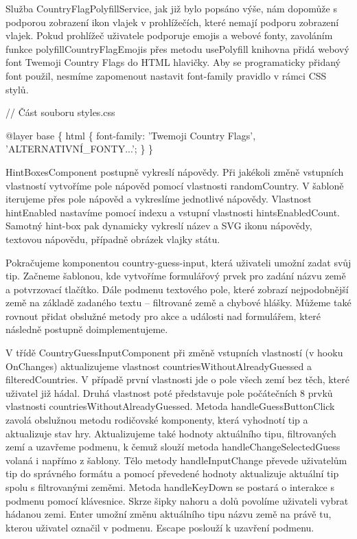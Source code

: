 Služba CountryFlagPolyfillService, jak již bylo popsáno výše, nám dopomůže s podporou zobrazení ikon vlajek v prohlížečích, které nemají podporu zobrazení vlajek. 
Pokud prohlížeč uživatele podporuje emojis a webové fonty, zavoláním funkce polyfillCountryFlagEmojis přes metodu usePolyfill knihovna přidá webový font Twemoji Country Flags do HTML hlavičky.
Aby se programaticky přidaný font použil, nesmíme zapomenout nastavit font-family pravidlo v rámci CSS stylů.

\begin{prog}
// Část souboru styles.css

@layer base \{
  html \{
    font-family: 'Twemoji Country Flags', 'ALTERNATIVNÍ_FONTY...';
  \}
\}
\end{prog}

HintBoxesComponent postupně vykreslí nápovědy. Při jakékoli změně vstupních vlastností vytvoříme pole nápověd pomocí vlastnosti randomCountry. 
V šabloně iterujeme přes pole nápověd a vykreslíme jednotlivé nápovědy. Vlastnost hintEnabled nastavíme pomocí indexu a vstupní vlastnosti hintsEnabledCount. 
Samotný hint-box pak dynamicky vykreslí název a SVG ikonu nápovědy, textovou nápovědu, případně obrázek vlajky státu.

Pokračujeme komponentou country-guess-input, která uživateli umožní zadat svůj tip. 
Začneme šablonou, kde vytvoříme formulářový prvek pro zadání názvu země a potvrzovací tlačítko. 
Dále podmenu textového pole, které zobrazí nejpodobnější země na základě zadaného textu -- filtrované země a chybové hlášky. 
Můžeme také rovnout přidat obslužné metody pro akce a události nad formulářem, které následně postupně doimplementujeme.

V třídě CountryGuessInputComponent při změně vstupních vlastností (v hooku OnChanges) aktualizujeme vlastnost countriesWithoutAlreadyGuessed a filteredCountries. 
V případě první vlastnosti jde o pole všech zemí bez těch, které uživatel již hádal. Druhá vlastnost poté představuje pole počátečních 8 prvků vlastnosti countriesWithoutAlreadyGuessed. 
Metoda handleGuessButtonClick zavolá obslužnou metodu rodičovské komponenty, která vyhodnotí tip a aktualizuje stav hry. 
Aktualizujeme také hodnoty aktuálního tipu, filtrovaných zemí a uzavřeme podmenu, k čemuž slouží metoda handleChangeSelectedGuess volaná i napřímo z šablony. 
Tělo metody handleInputChange převede uživatelům tip do správného formátu a pomocí převedené hodnoty aktualizuje aktuální tip spolu s filtrovanými zeměmi.
Metoda handleKeyDown se postará o interakce s podmenu pomocí klávesnice. Skrze šipky nahoru a dolů povolíme uživateli vybrat hádanou zemi. 
Enter umožní změnu aktuálního tipu názvu země na právě tu, kterou uživatel označil v podmenu. Escape poslouží k uzavření podmenu.

